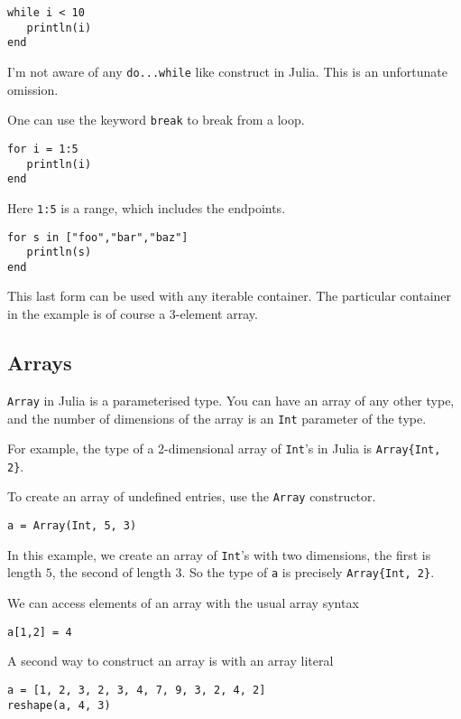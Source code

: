 \documentclass[a4paper,10pt]{article}
\newcommand{\code}{\lstinline}
\begin{document}
{\begin{lstlisting}
while i < 10
   println(i)
end
\end{lstlisting}

I'm not aware of any \code{do...while} like construct in Julia. This is an unfortunate omission.

One can use the keyword \code{break} to break from a loop.

\begin{lstlisting}
for i = 1:5
   println(i)
end
\end{lstlisting}

Here \code{1:5} is a range, which includes the endpoints.

\begin{lstlisting}
for s in ["foo","bar","baz"]
   println(s)
end
\end{lstlisting}

This last form can be used with any iterable container. The particular container in the example is
of course a 3-element array.

\subsection{Arrays}

\code{Array} in Julia is a parameterised type. You can have an array of any other type, and the 
number of dimensions of the array is an \code{Int} parameter of the type.

For example, the type of a 2-dimensional array of \code{Int}'s in Julia is \code|Array{Int, 2}|.

To create an array of undefined entries, use the \code{Array} constructor.

\begin{lstlisting}
a = Array(Int, 5, 3)
\end{lstlisting}

In this example, we create an array of \code{Int}'s with two dimensions, the first is length $5$,
the second of length $3$. So the type of \code{a} is precisely \code|Array{Int, 2}|.

We can access elements of an array with the usual array syntax

\begin{lstlisting}
a[1,2] = 4
\end{lstlisting}

A second way to construct an array is with an array literal

\begin{lstlisting}
a = [1, 2, 3, 2, 3, 4, 7, 9, 3, 2, 4, 2]
reshape(a, 4, 3)
\end{lstlisting}

}
\end{document}
